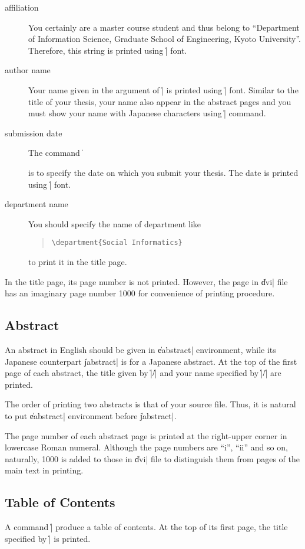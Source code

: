 \begin{description}
\item[affiliation]
You certainly are a master course student and thus belong to ``Department of
Information Science, Graduate School of Engineering, Kyoto University''.
Therefore, this string is printed using \|\large| font.

\item[author name]
Your name given in the argument of \|\eauthor| is printed using \|\Large|
font.  Similar to the title of your thesis, your name also appear in the
abstract pages and you must show your name with Japanese characters using
\|\jauthor| command.

\item[submission date]
The command \|\date| is to specify the date on which you submit your thesis.
The date is printed using \|\large| font.

\item[department name]
You should specify the name of department like
\begin{quote}\begin{verbatim}
\department{Social Informatics}
\end{verbatim}\end{quote}
to print it in the title page.

\end{description}%
In the title page, its page number is not printed.  However, the page in
\|dvi| file has an imaginary page number 1000 for convenience of printing
procedure.

\subsection{Abstract}\label{appsub-abstract}
An abstract in English should be given in \|eabstract| environment, while
its Japanese counterpart \|jabstract| is for a Japanese abstract.  At the
top of the first page of each abstract, the title given by
\|\etitle|\slash\|\jtitle| and your name specified by
\|\eauthor|\slash\|\jauthor| are printed.

The order of printing two abstracts is that of your source file.  Thus, it is
natural to put \|eabstract| environment before \|jabstract|.

The page number of each abstract page is printed at the right-upper corner in
lowercase Roman numeral.  Although the page numbers are ``i'', ``ii'' and so
on, naturally, 1000 is added to those in \|dvi| file to distinguish them
from pages of the main text in printing.

\subsection{Table of Contents}\label{appsub-toc}
A command \|\tableofcontents| produce a table of contents.  At the top of
its first page, the title specified by \|\etitle| is printed.

